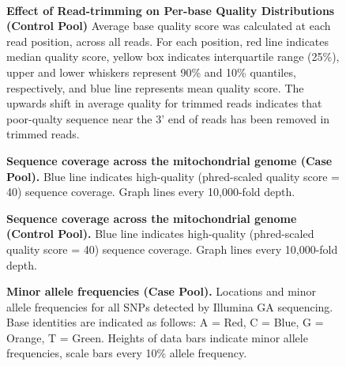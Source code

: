 \begin{figure}
  \begin{center}
   \\
  \end{center}
  \caption[Per-base Quality Distributions]{
    \small{\textbf{Effect of Read-trimming on Per-base Quality Distributions (Control Pool)} Average base quality score was calculated at each read position, across all reads.  For each position, red line indicates median quality score, yellow box indicates interquartile range (25\%), upper and lower whiskers represent 90\% and 10\% quantiles, respectively, and blue line represents mean quality score.  The upwards shift in average quality for trimmed reads indicates that poor-qualty sequence near the 3' end of reads has been removed in trimmed reads.}}
  \label{var.fig.base_quality_cont}
\end{figure}

\begin{figure}
\noindent{}
  \caption[Sequence Coverage for Case Pool]{
    \small{\textbf{Sequence coverage across the mitochondrial genome (Case Pool).} Blue line indicates high-quality (phred-scaled quality score = 40) sequence coverage. Graph lines every 10,000-fold depth.}}
  \label{var.fig.coverage_case}
\end{figure}

\begin{figure}
\noindent{}
  \caption[Sequence Coverage for Control Pool]{
    \small{\textbf{Sequence coverage across the mitochondrial genome (Control Pool).} Blue line indicates high-quality (phred-scaled quality score = 40) sequence coverage. Graph lines every 10,000-fold depth.}}
  \label{var.fig.coverage_cont}
\end{figure}

\begin{figure}
\noindent{}
  \caption[Minor Allele Frequencies for Case Pool]{
    \small{\textbf{Minor allele frequencies (Case Pool).} Locations and minor allele frequencies for all SNPs detected by Illumina GA sequencing.  Base identities are indicated as follows: A = Red, C = Blue, G = Orange, T = Green.  Heights of data bars indicate minor allele frequencies, scale bars every 10\% allele frequency.}}
  \label{var.fig.snp_case}
\end{figure}

